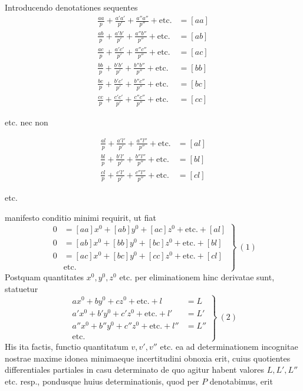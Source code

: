 Introducendo denotationes sequentes
\[
\begin{aligned}
\frac{aa}{p}+\frac{a'a'}{p'}+\frac{a''a''}{p''}+\text{etc.}&=[aa]\\[4pt]
\frac{ab}{p}+\frac{a'b'}{p'}+\frac{a''b''}{p''}+\text{etc.}&=[ab]\\[4pt]
\frac{ac}{p}+\frac{a'c'}{p'}+\frac{a''c''}{p''}+\text{etc.}&=[ac]\\[4pt]
\frac{bb}{p}+\frac{b'b'}{p'}+\frac{b''b''}{p''}+\text{etc.}&=[bb]\\[4pt]
\frac{bc}{p}+\frac{b'c'}{p'}+\frac{b''c''}{p''}+\text{etc.}&=[bc]\\[4pt]
\frac{cc}{p}+\frac{c'c'}{p'}+\frac{c''c''}{p''}+\text{etc.}&=[cc]
\end{aligned}
\]
\begin{center}etc. nec non\end{center}
\[
\begin{aligned}
\frac{al}{p}+\frac{a'l'}{p'}+\frac{a''l''}{p''}+\text{etc.}&=[al]\\[4pt]
\frac{bl}{p}+\frac{b'l'}{p'}+\frac{b''l''}{p''}+\text{etc.}&=[bl]\\[4pt]
\frac{cl}{p}+\frac{c'l'}{p'}+\frac{c''l''}{p''}+\text{etc.}&=[cl]
\end{aligned}
\]
\begin{center}etc.\end{center}
manifesto conditio minimi requirit, ut fiat
\[
\left.\begin{aligned}
0&=[aa]x^0+[ab]y^0+[ac]z^0+\text{etc.}+[al]\\
0&=[ab]x^0+[bb]y^0+[bc]z^0+\text{etc.}+[bl]\\
0&=[ac]x^0+[bc]y^0+[cc]z^0+\text{etc.}+[cl]\\
&\text{etc.}
\end{aligned}\right\}\ (1)
\]
Postquam quantitates \(x^0,y^0,z^0\) etc. per eliminationem hinc derivatae sunt, statuetur
\[
\left.\begin{aligned}
ax^0+by^0+cz^0+\text{etc.}+l&=L\\
a'x^0+b'y^0+c'z^0+\text{etc.}+l'&=L'\\
a''x^0+b''y^0+c''z^0+\text{etc.}+l''&=L''\\
\text{etc.}\quad&
\end{aligned}\right\}\ (2)
\]
His ita factis, functio quantitatum \(v,v',v''\) etc. ea ad determinationem incognitae nostrae maxime idonea minimaeque incertitudini obnoxia erit, cuius quotientes differentiales partiales in casu determinato de quo agitur habent valores \(L,L',L''\) etc. resp., pondusque huius determinationis, quod per \(P\) denotabimus, erit
